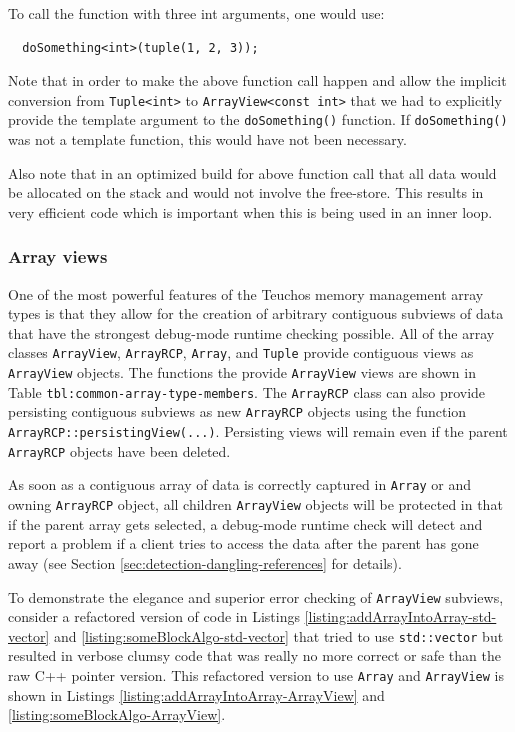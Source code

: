 \documentclass[pdf,ps2pdf,11pt]{SANDreport}
\begin{document}
To call the function with three int arguments, one would use:

{\small\begin{verbatim}
  doSomething<int>(tuple(1, 2, 3));
\end{verbatim}}

Note that in order to make the above function call happen and allow
the implicit conversion from {}\texttt{Tuple<int>} to
{}\texttt{ArrayView<const int>} that we had to explicitly provide the
template argument to the {}\texttt{doSomething()} function.  If
{}\texttt{doSomething()} was not a template function, this would have
not been necessary.

Also note that in an optimized build for above function call that all
data would be allocated on the stack and would not involve the
free-store.  This results in very efficient code which is important
when this is being used in an inner loop.


%
{}\subsubsection{Array views}
\label{sec:array-views}
%

One of the most powerful features of the Teuchos memory management
array types is that they allow for the creation of arbitrary
contiguous subviews of data that have the strongest debug-mode runtime
checking possible.  All of the array classes {}\texttt{ArrayView},
{}\texttt{ArrayRCP}, {}\texttt{Array}, and {}\texttt{Tuple} provide
contiguous views as {}\texttt{ArrayView} objects.  The functions the
provide {}\texttt{ArrayView} views are shown in Table
{}\texttt{tbl:common-array-type-members}.  The {}\texttt{ArrayRCP}
class can also provide persisting contiguous subviews as new
{}\texttt{ArrayRCP} objects using the function
{}\texttt{ArrayRCP::persistingView(...)}.  Persisting views will
remain even if the parent {}\texttt{ArrayRCP} objects have been deleted.

As soon as a contiguous array of data is correctly captured in
{}\texttt{Array} or and owning {}\texttt{ArrayRCP} object, all
children {}\texttt{ArrayView} objects will be protected in that if the
parent array gets selected, a debug-mode runtime check will detect and
report a problem if a client tries to access the data after the parent
has gone away (see Section {}\ref{sec:detection-dangling-references}
for details).

To demonstrate the elegance and superior error checking of
{}\texttt{ArrayView} subviews, consider a refactored version of code
in Listings {}\ref{listing:addArrayIntoArray-std-vector} and
{}\ref{listing:someBlockAlgo-std-vector} that tried to use
{}\texttt{std::vector} but resulted in verbose clumsy code that was
really no more correct or safe than the raw C++ pointer version.  This
refactored version to use {}\texttt{Array} and {}\texttt{ArrayView} is
shown in Listings {}\ref{listing:addArrayIntoArray-ArrayView} and
{}\ref{listing:someBlockAlgo-ArrayView}.
\end{document}
